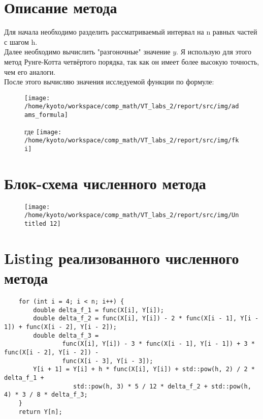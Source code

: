 \tableofcontents

\newpage



\section{Описание метода}
Для начала необходимо разделить рассматриваемый интервал на n равных частей с шагом h.\\
Далее необходимо вычислить "разгоночные" значение $y$. Я использую для этого метод Рунге-Котта четвёртого
порядка, так как он имеет более высокую точность, чем его аналоги.\\
После этого вычисляю значения исследуемой функции по формуле:\\
\begin{figure}[H]
    \centering
    \texttt{[image: /home/kyoto/workspace/comp\_math/VT\_labs\_2/report/src/img/adams\_formula]}
\end{figure}

\begin{figure}[H]
    \centering
    где
    \texttt{[image: /home/kyoto/workspace/comp\_math/VT\_labs\_2/report/src/img/fki]}
\end{figure}
\section{Блок-схема численного метода}
\begin{figure}[H]
    \centering
    \texttt{[image: /home/kyoto/workspace/comp\_math/VT\_labs\_2/report/src/img/Untitled 12]}
\end{figure}


\section{Listing реализованного численного метода}
\tiny
\begin{verbatim}
    for (int i = 4; i < n; i++) {
        double delta_f_1 = func(X[i], Y[i]);
        double delta_f_2 = func(X[i], Y[i]) - 2 * func(X[i - 1], Y[i - 1]) + func(X[i - 2], Y[i - 2]);
        double delta_f_3 =
                func(X[i], Y[i]) - 3 * func(X[i - 1], Y[i - 1]) + 3 * func(X[i - 2], Y[i - 2]) -
                func(X[i - 3], Y[i - 3]);
        Y[i + 1] = Y[i] + h * func(X[i], Y[i]) + std::pow(h, 2) / 2 * delta_f_1 +
                   std::pow(h, 3) * 5 / 12 * delta_f_2 + std::pow(h, 4) * 3 / 8 * delta_f_3;
    }
    return Y[n];
\end{verbatim}
\normalsize
\newpage

